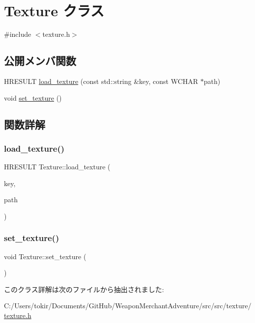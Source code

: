 \hypertarget{class_texture}{}\section{Texture クラス}
\label{class_texture}


{\ttfamily \#include $<$texture.\+h$>$}

\subsection*{公開メンバ関数}
\begin{DoxyCompactItemize}
\item 
H\+R\+E\+S\+U\+LT \mbox{\hyperlink{class_texture_a9fdaf8d34b71977ed6aad6f87d81832d}{load\+\_\+texture}} (const std\+::string \&key, const W\+C\+H\+AR $\ast$path)
\item 
void \mbox{\hyperlink{class_texture_a6cac0efa198c91c70d447a51b3e37e1b}{set\+\_\+texture}} ()
\end{DoxyCompactItemize}


\subsection{関数詳解}
\mbox{\label{class_texture_a9fdaf8d34b71977ed6aad6f87d81832d}} 
\subsubsection{\texorpdfstring{load\+\_\+texture()}{load\_texture()}}
{\footnotesize\ttfamily H\+R\+E\+S\+U\+LT Texture\+::load\+\_\+texture (\begin{DoxyParamCaption}\item[{const std\+::string \&}]{key,  }\item[{const W\+C\+H\+AR $\ast$}]{path }\end{DoxyParamCaption})\hspace{0.3cm}{\ttfamily [inline]}}

\mbox{\label{class_texture_a6cac0efa198c91c70d447a51b3e37e1b}} 
\subsubsection{\texorpdfstring{set\+\_\+texture()}{set\_texture()}}
{\footnotesize\ttfamily void Texture\+::set\+\_\+texture (\begin{DoxyParamCaption}{ }\end{DoxyParamCaption})\hspace{0.3cm}{\ttfamily [inline]}}



このクラス詳解は次のファイルから抽出されました\+:\begin{DoxyCompactItemize}
\item 
C\+:/\+Users/tokir/\+Documents/\+Git\+Hub/\+Weapon\+Merchant\+Adventure/src/src/texture/\mbox{\hyperlink{texture_8h}{texture.\+h}}\end{DoxyCompactItemize}
